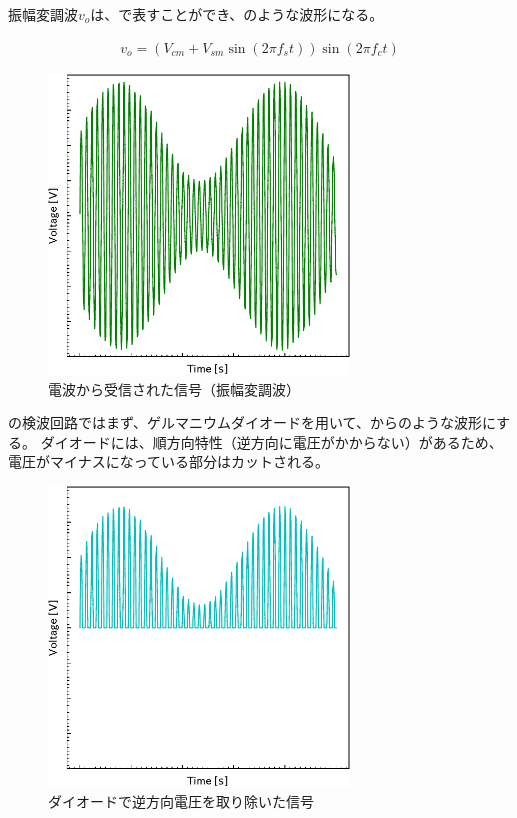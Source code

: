 \documentclass[report.tex]{subfiles}
\begin{document}
振幅変調波\(v_o\)は、で表すことができ、のような波形になる。

\begin{align}
	v_o = (V_{cm} + V_{sm} \sin(2 \pi f_s t)) \sin(2 \pi f_c t) \label{eq:v_o}
\end{align}

\begin{figure}[H]
	\centering
	\includegraphics[width=8cm]{fig/Wave.pdf}
	\caption{電波から受信された信号（振幅変調波）}
	\label{fig:wave}
\end{figure}

の検波回路ではまず、ゲルマニウムダイオードを用いて、からのような波形にする。
ダイオードには、順方向特性（逆方向に電圧がかからない）があるため、電圧がマイナスになっている部分はカットされる\cite{電子回路}。

\begin{figure}[H]
	\centering
	\includegraphics[width=8cm]{fig/diode.pdf}
	\caption{ダイオードで逆方向電圧を取り除いた信号}
	\label{fig:diode}
\end{figure}
\end{document}

